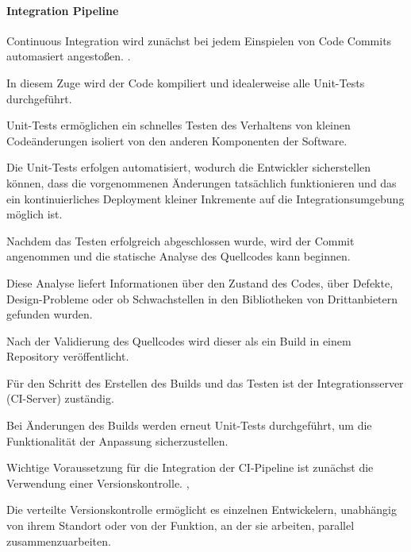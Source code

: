 \paragraph{Integration Pipeline} 

Continuous Integration wird zunächst bei jedem Einspielen von Code Commits automasiert angestoßen. \cite[S. 266]{tokarski_strategische_2018}. 

In diesem Zuge wird der Code kompiliert und idealerweise alle Unit-Tests durchgeführt.  

Unit-Tests ermöglichen ein schnelles Testen des Verhaltens von kleinen Codeänderungen isoliert von den anderen Komponenten der Software. \cite[S. 60]{humble_continuous_2011} 

Die Unit-Tests erfolgen automatisiert, wodurch die Entwickler sicherstellen können, dass die vorgenommenen Änderungen tatsächlich funktionieren und das ein kontinuierliches Deployment kleiner Inkremente auf die Integrationsumgebung möglich ist.

Nachdem das Testen erfolgreich abgeschlossen wurde, wird der Commit angenommen und die statische Analyse des Quellcodes kann beginnen. \cite[S. 61]{verona_practical_2016} 

Diese Analyse liefert Informationen über den Zustand des Codes, über Defekte, Design-Probleme oder ob Schwachstellen in den Bibliotheken von Drittanbietern gefunden wurden. \cite[S. 61]{verona_practical_2016} 

Nach der Validierung des Quellcodes wird dieser als ein Build in einem Repository veröffentlicht.

Für den Schritt des Erstellen des Builds und das Testen ist der Integrationsserver (CI-Server) zuständig. 

Bei Änderungen des Builds werden erneut Unit-Tests durchgeführt, um die Funktionalität der Anpassung sicherzustellen. \cite[S. 57]{forsgren_mindset_2019} 

Wichtige Voraussetzung für die Integration der CI-Pipeline ist zunächst die Verwendung einer Versionskontrolle. \cite[S. 100 - 101]{bass_devops_2015}, \cite[S. 57]{forsgren_mindset_2019} 

Die verteilte Versionskontrolle ermöglicht es einzelnen Entwickelern, unabhängig von ihrem Standort oder von der Funktion, an der sie arbeiten, parallel zusammenzuarbeiten.


